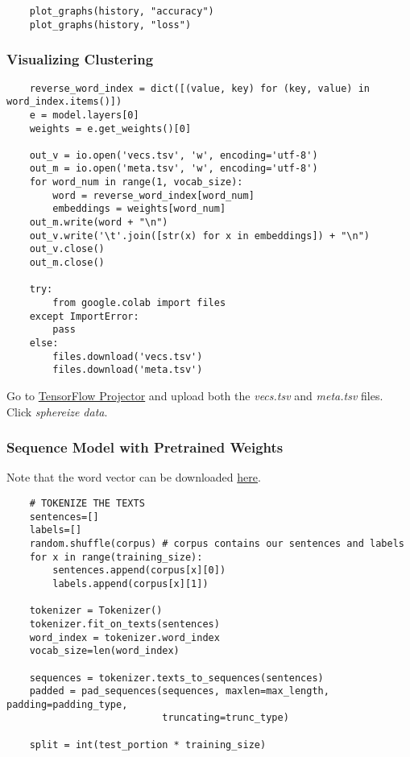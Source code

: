\documentclass[11pt, a4paper]{article}
\begin{document}
\begin{spacing}{1.1}
\begin{lstlisting}
	plot_graphs(history, "accuracy")
	plot_graphs(history, "loss")
	\end{lstlisting} \vspace*{1mm}
	
	\subsubsection{Visualizing Clustering}
	\begin{lstlisting}
	reverse_word_index = dict([(value, key) for (key, value) in word_index.items()])
	e = model.layers[0]
	weights = e.get_weights()[0]
	
	out_v = io.open('vecs.tsv', 'w', encoding='utf-8')
	out_m = io.open('meta.tsv', 'w', encoding='utf-8')
	for word_num in range(1, vocab_size):
		word = reverse_word_index[word_num]
		embeddings = weights[word_num]
	out_m.write(word + "\n")
	out_v.write('\t'.join([str(x) for x in embeddings]) + "\n")
	out_v.close()
	out_m.close()
	
	try:
		from google.colab import files
	except ImportError:
		pass
	else:
		files.download('vecs.tsv')
		files.download('meta.tsv')
	\end{lstlisting} \vspace*{1mm}
	Go to \href{https://projector.tensorflow.org/}{TensorFlow Projector} and upload both the \textit{vecs.tsv} and \textit{meta.tsv} files.\\
	Click \textit{sphereize data}. \newpage

	\subsubsection{Sequence Model with Pretrained Weights}
	Note that the word vector can be downloaded \href{https://nlp.stanford.edu/projects/glove/}{here}.
	\begin{lstlisting}
	# TOKENIZE THE TEXTS 
	sentences=[]
	labels=[]
	random.shuffle(corpus) # corpus contains our sentences and labels
	for x in range(training_size):
		sentences.append(corpus[x][0])
		labels.append(corpus[x][1])
	
	tokenizer = Tokenizer()
	tokenizer.fit_on_texts(sentences)
	word_index = tokenizer.word_index
	vocab_size=len(word_index)
	
	sequences = tokenizer.texts_to_sequences(sentences)
	padded = pad_sequences(sequences, maxlen=max_length, padding=padding_type, 
	                       truncating=trunc_type)
	
	split = int(test_portion * training_size)
	

\end{lstlisting}
\end{spacing}
\end{document}
